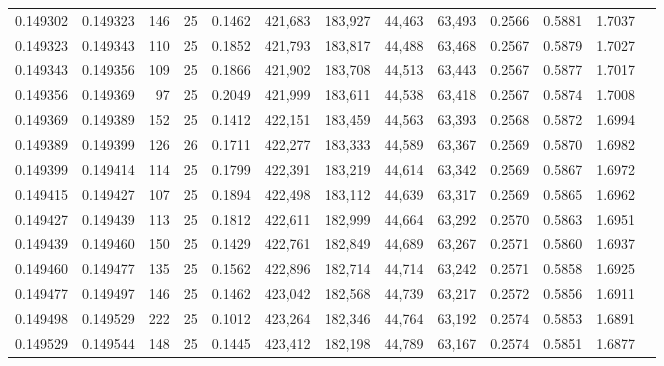 \begin{tabular}{rrrrrrrrrrrrr}
0.149302 & 0.149323 &   146 &  25 &                                     0.1462 & 421,683 & 183,927 &  44,463 &  63,493 & 0.2566 & 0.5881 & 1.7037 \\
0.149323 & 0.149343 &   110 &  25 &                                     0.1852 & 421,793 & 183,817 &  44,488 &  63,468 & 0.2567 & 0.5879 & 1.7027 \\
0.149343 & 0.149356 &   109 &  25 &                                     0.1866 & 421,902 & 183,708 &  44,513 &  63,443 & 0.2567 & 0.5877 & 1.7017 \\
0.149356 & 0.149369 &    97 &  25 &                                     0.2049 & 421,999 & 183,611 &  44,538 &  63,418 & 0.2567 & 0.5874 & 1.7008 \\
0.149369 & 0.149389 &   152 &  25 &                                     0.1412 & 422,151 & 183,459 &  44,563 &  63,393 & 0.2568 & 0.5872 & 1.6994 \\
0.149389 & 0.149399 &   126 &  26 &                                     0.1711 & 422,277 & 183,333 &  44,589 &  63,367 & 0.2569 & 0.5870 & 1.6982 \\
0.149399 & 0.149414 &   114 &  25 &                                     0.1799 & 422,391 & 183,219 &  44,614 &  63,342 & 0.2569 & 0.5867 & 1.6972 \\
0.149415 & 0.149427 &   107 &  25 &                                     0.1894 & 422,498 & 183,112 &  44,639 &  63,317 & 0.2569 & 0.5865 & 1.6962 \\
0.149427 & 0.149439 &   113 &  25 &                                     0.1812 & 422,611 & 182,999 &  44,664 &  63,292 & 0.2570 & 0.5863 & 1.6951 \\
0.149439 & 0.149460 &   150 &  25 &                                     0.1429 & 422,761 & 182,849 &  44,689 &  63,267 & 0.2571 & 0.5860 & 1.6937 \\
0.149460 & 0.149477 &   135 &  25 &                                     0.1562 & 422,896 & 182,714 &  44,714 &  63,242 & 0.2571 & 0.5858 & 1.6925 \\
0.149477 & 0.149497 &   146 &  25 &                                     0.1462 & 423,042 & 182,568 &  44,739 &  63,217 & 0.2572 & 0.5856 & 1.6911 \\
0.149498 & 0.149529 &   222 &  25 &                                     0.1012 & 423,264 & 182,346 &  44,764 &  63,192 & 0.2574 & 0.5853 & 1.6891 \\
0.149529 & 0.149544 &   148 &  25 &                                     0.1445 & 423,412 & 182,198 &  44,789 &  63,167 & 0.2574 & 0.5851 & 1.6877 \\

\end{tabular}
